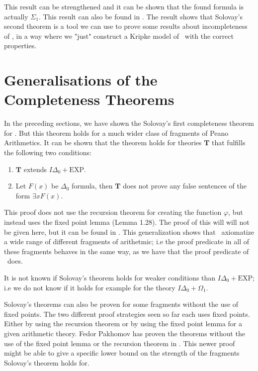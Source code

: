 \documentclass[../main.tex]{subfiles}
\begin{document}
This result can be strengthened and it can be shown that the found formula is
actually $\Sigma_1$. This result can also be found in \citet{Smor1985}.
The result shows that Solovay's second theorem is a tool we can use to prove
some results about incompleteness of \PRA, in a way where we "just" construct a
Kripke model of \GL\ with the correct properties.
\section{Generalisations  of the Completeness Theorems}

In the preceding sections, we have shown the Solovay's first completeness theorem for \PRA.
But this theorem holds for a much wider class of fragments of Peano
Arithmetics. It can be shown that the theorem holds for
theories $\textbf{T}$ that fulfills the following two conditions:
\begin{enumerate}
	\item $\textbf{T}$ extends $I\Delta_0+\text{EXP}$.
	\item Let $F(x)$ be $ \Delta_0$ formula, then $\textbf{T}$ does not prove any
		false sentences of the form $\exists x F(x)$.
\end{enumerate}

This proof does not use the recursion theorem for creating the function
$\varphi$, but instead uses the fixed point lemma (Lemma 1.28). The
proof of this will will not be given here, but it can be found in
\citet{Dick1991}. This generalization shows that \GL\ axiomatize a wide
range of different fragments of arithetmic; i.e the proof predicate in all of
these fragments behaves in the same way, as we have that the proof predicate of
\PRA\ does.

It is not known if Solovay's theorem holds for weaker conditions than
$I\Delta_0+\text{EXP}$; i.e we do not know if it holds for example for the theory
$I\Delta_0+\Omega_1$.



Solovay's theorems can also be proven for some fragments without the use of
fixed points. The two different proof strategies seen so far each uses fixed
points. Either by using the recursion theorem or by using the fixed
point lemma for a given arithmetic theory. Fedor Pakhomov has proven the theorems
without the use of the fixed point lemma or the recursion theorem in
\citet{Fedo2017}. This
newer proof might be able to give a specific lower bound on the strength of
the fragments Solovay's theorem holds for.
\end{document}
